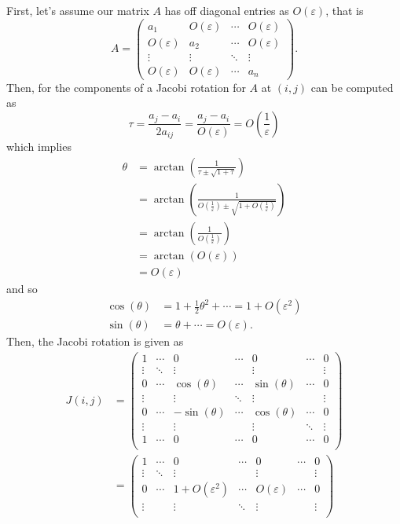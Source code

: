 \documentclass[a4paper,12pt]{article}
\newcommand{\eps}{\varepsilon}
\newcommand{\pmat}[1]{\begin{pmatrix} #1 \end{pmatrix}}
\begin{document}
\begin{enumerate}[label = (\arabic*)]
	First, let's assume our matrix $ A $ has off diagonal entries as $ O(\eps) $, that is
	\[
		A = 
			\pmat{
				a_1 & O(\eps) & \cdots & O(\eps) \\
				O(\eps) & a_2 & \cdots & O(\eps) \\
				\vdots & \vdots & \ddots & \vdots \\
				O(\eps) & O(\eps) & \cdots & a_n
			}.
	\]
	Then, for the components of a Jacobi rotation for $ A $ at $ (i,j) $ can be computed as
	\[
		\tau = \frac{a_j - a_i}{2 a_{ij}} = \frac{a_j - a_i}{O(\eps)} = O\left(\frac{1}{\eps}\right)
	\]
	which implies
	\begin{align*}
		\theta &= \arctan\left(\frac{1}{\tau \pm \sqrt{1 + \tau}}\right) \\
		&= \arctan\left(\frac{1}{O\left(\frac{1}{\eps}\right) \pm \sqrt{1 + O\left(\frac{1}{\eps}\right)}}\right) \\
		&= \arctan \left(\frac{1}{O\left(\frac{1}{\eps}\right)}\right) \\
		&= \arctan(O(\eps)) \\
		&= O(\eps)
	\end{align*}
	and so
	\begin{align*}
		\cos(\theta) &= 1 + \frac{1}{2}\theta^2 + \cdots = 1 + O(\eps^2) \\
		\sin(\theta) &= \theta + \cdots = O(\eps).
	\end{align*}
	Then, the Jacobi rotation is given as
	\begin{align*}
		J(i,j) &= 
				\pmat{
					1 & \cdots & 0 & \cdots & 0 & \cdots & 0 \\
					\vdots & \ddots & \vdots & & \vdots & & \vdots \\
					0 & \cdots & \cos(\theta) & \cdots & \sin(\theta) & \cdots & 0 \\
					\vdots &  & \vdots & \ddots & \vdots & & \vdots \\
					0 & \cdots & -\sin(\theta) & \cdots & \cos(\theta) & \cdots & 0 \\
					\vdots &  & \vdots & & \vdots & \ddots & \vdots \\
					1 & \cdots & 0 & \cdots & 0 & \cdots & 0 \\
				} \\
			&= 
				\pmat{
					1 & \cdots & 0 & \cdots & 0 & \cdots & 0 \\
					\vdots & \ddots & \vdots & & \vdots & & \vdots \\
					0 & \cdots & 1 + O(\eps^2) & \cdots & O(\eps) & \cdots & 0 \\
					\vdots &  & \vdots & \ddots & \vdots & & \vdots \\
}
\end{align*}
\end{enumerate}
\end{document}
